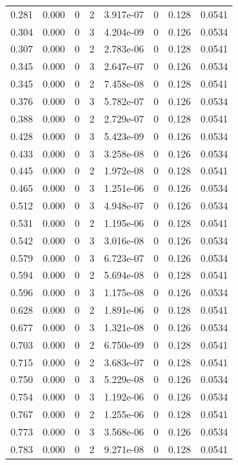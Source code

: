 \documentclass[preview]{standalone}
\begin{document}
{{\begin{tabular}{L{1.2cm}C{1.2cm} C{0.3cm}C{0.5cm} C{1.4cm}C{1.4cm} C{1.4cm}C{1.4cm}}
  0.281  &  0.000  & 0     &  2 &  3.917e-07  & 0  & 0.128 &  0.0541   \\ 
  0.304  &  0.000  & 0     &  3 &  4.204e-09  & 0  & 0.126 &  0.0534   \\ 
  0.307  &  0.000  & 0     &  2 &  2.783e-06  & 0  & 0.128 &  0.0541   \\ 
  0.345  &  0.000  & 0     &  3 &  2.647e-07  & 0  & 0.126 &  0.0534   \\ 
  0.345  &  0.000  & 0     &  2 &  7.458e-08  & 0  & 0.128 &  0.0541   \\ 
  0.376  &  0.000  & 0     &  3 &  5.782e-07  & 0  & 0.126 &  0.0534   \\ 
  0.388  &  0.000  & 0     &  2 &  2.729e-07  & 0  & 0.128 &  0.0541   \\ 
  0.428  &  0.000  & 0     &  3 &  5.423e-09  & 0  & 0.126 &  0.0534   \\ 
  0.433  &  0.000  & 0     &  3 &  3.258e-08  & 0  & 0.126 &  0.0534   \\ 
  0.445  &  0.000  & 0     &  2 &  1.972e-08  & 0  & 0.128 &  0.0541   \\ 
  0.465  &  0.000  & 0     &  3 &  1.251e-06  & 0  & 0.126 &  0.0534   \\ 
  0.512  &  0.000  & 0     &  3 &  4.948e-07  & 0  & 0.126 &  0.0534   \\ 
  0.531  &  0.000  & 0     &  2 &  1.195e-06  & 0  & 0.128 &  0.0541   \\ 
  0.542  &  0.000  & 0     &  3 &  3.016e-08  & 0  & 0.126 &  0.0534   \\ 
  0.579  &  0.000  & 0     &  3 &  6.723e-07  & 0  & 0.126 &  0.0534   \\ 
  0.594  &  0.000  & 0     &  2 &  5.694e-08  & 0  & 0.128 &  0.0541   \\ 
  0.596  &  0.000  & 0     &  3 &  1.175e-08  & 0  & 0.126 &  0.0534   \\ 
  0.628  &  0.000  & 0     &  2 &  1.891e-06  & 0  & 0.128 &  0.0541   \\ 
  0.677  &  0.000  & 0     &  3 &  1.321e-08  & 0  & 0.126 &  0.0534   \\ 
  0.703  &  0.000  & 0     &  2 &  6.750e-09  & 0  & 0.128 &  0.0541   \\ 
  0.715  &  0.000  & 0     &  2 &  3.683e-07  & 0  & 0.128 &  0.0541   \\ 
  0.750  &  0.000  & 0     &  3 &  5.229e-08  & 0  & 0.126 &  0.0534   \\ 
  0.754  &  0.000  & 0     &  3 &  1.192e-06  & 0  & 0.126 &  0.0534   \\ 
  0.767  &  0.000  & 0     &  2 &  1.255e-06  & 0  & 0.128 &  0.0541   \\ 
  0.773  &  0.000  & 0     &  3 &  3.568e-06  & 0  & 0.126 &  0.0534   \\ 
  0.783  &  0.000  & 0     &  2 &  9.271e-08  & 0  & 0.128 &  0.0541   \\ 
\hline 
\end{tabular} 

}}
\end{document}
